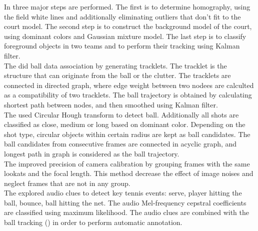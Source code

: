 In \cite{Chen:2007jma} three major steps are performed. The first is to determine homography, using the field white lines and additionally eliminating outliers that don't fit to the court model. The second step is to construct the background model of the court, using dominant colors and Gaussian mixture model. The last step is to classify foreground objects in two teams and to perform their tracking using Kalman filter.\\

The \cite{Yan:2015ca} did ball data association by generating tracklets. The tracklet is the structure that can originate from the ball or the clutter. The tracklets are connected in directed graph, where edge weight between two nodees are calculted as a compatibility of two tracklets. The ball trajectory is obtained by calculating shortest path between nodes, and then smoothed using Kalman filter.\\

The \cite{Pallavi:2008em} used Circular Hough transform to detect ball. Additionally all shots are classified as close, medium or long based on dominant color. Depending on the shot type, circular objects within certain radius are kept as ball candidates. The ball candidates from consecutive frames are connected in acyclic graph, and longest path in graph is considered as the ball trajectory.\\


The \cite{Yu:2009ch} improved precision of camera calibration by grouping frames with the same lookats and the focal length. This method decrease the effect of image noises and neglect frames that are not in any group. \\

The \cite{Yan:2014hk} explored audio clues to detect key tennis events: serve, player hitting the ball, bounce, ball hitting the net. The audio Mel-frequency cepstral coefficients are classified using maximum likelihood. The audio clues are combined with the ball tracking (\cite{Yan:2015ca}) in order to perform automatic annotation.



